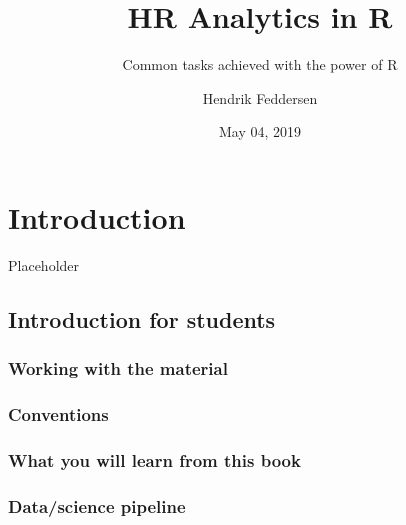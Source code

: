 \documentclass[12pt, krantz2,]{krantz}
\title{HR Analytics in R}
\subtitle{Common tasks achieved with the power of R}
\author{Hendrik Feddersen}
\date{May 04, 2019}
\begin{document}
\maketitle


\thispagestyle{empty}

\begin{center}
\end{center}

\setlength{\abovedisplayskip}{-5pt}
\setlength{\abovedisplayshortskip}{-5pt}

{
\hypersetup{linkcolor=}
\setcounter{tocdepth}{2}
\tableofcontents
}
\listoftables
\listoffigures
\hypertarget{intro}{%
\chapter{Introduction}\label{intro}}

Placeholder

\hypertarget{sec:intro-for-students}{%
\section{Introduction for students}\label{sec:intro-for-students}}

\hypertarget{workingwithmaterials}{%
\subsection*{Working with the material}\label{workingwithmaterials}}


\hypertarget{conventions}{%
\subsection*{Conventions}\label{conventions}}


\hypertarget{subsec:learning-goals}{%
\subsection{What you will learn from this book}\label{subsec:learning-goals}}

\hypertarget{subsec:pipeline}{%
\subsection{Data/science pipeline}\label{subsec:pipeline}}
\end{document}
